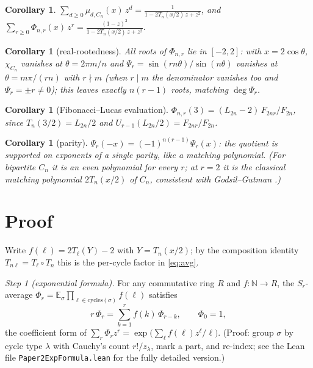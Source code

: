 \documentclass[11pt]{article}
\newtheorem{corollary}[theorem]{Corollary}
\theoremstyle{remark}
\newcommand{\E}{\mathbb{E}}
\begin{document}
\begin{corollary}\label{cor:gf}
$\displaystyle\sum_{d\ge 0}\mu_{d,C_n}(x)\,z^d=\frac{1}{1-2T_n(x/2)\,z+z^2}$,
\quad and \quad
$\displaystyle\sum_{r\ge 0}\Phi_{n,r}(x)\,z^r=\frac{(1-z)^2}{1-2T_n(x/2)\,z+z^2}$.
\end{corollary}

\begin{corollary}[real-rootedness]\label{cor:roots}
All roots of $\Phi_{n,r}$ lie in $[-2,2]$: with $x=2\cos\theta$,
$\chi_{C_n}$ vanishes at $\theta=2\pi m/n$ and
$\Psi_r=\sin(rn\theta)/\sin(n\theta)$ vanishes at $\theta=m\pi/(rn)$ with $r\nmid m$
(when $r\mid m$ the denominator vanishes too and $\Psi_r=\pm r\neq0$); this leaves
exactly $n(r-1)$ roots, matching $\deg\Psi_r$.
\end{corollary}

\begin{corollary}[Fibonacci--Lucas evaluation]\label{cor:fib}
$\Phi_{n,r}(3)=(L_{2n}-2)\,F_{2nr}/F_{2n}$, since $T_n(3/2)=L_{2n}/2$ and
$U_{r-1}(L_{2n}/2)=F_{2nr}/F_{2n}$.
\end{corollary}

\begin{corollary}[parity]\label{cor:parity}
$\Psi_r(-x)=(-1)^{n(r-1)}\Psi_r(x)$: the quotient is supported on exponents
of a single parity, like a matching polynomial. (For bipartite $C_n$ it is an
even polynomial for every $r$; at $r=2$ it is the classical matching
polynomial $2T_n(x/2)$ of $C_n$, consistent with Godsil--Gutman
\cite{GG}.)
\end{corollary}

\section{Proof}

Write $f(\ell)=2T_\ell(Y)-2$ with $Y=T_n(x/2)$; by the composition identity
$T_{n\ell}=T_\ell\circ T_n$ this is the per-cycle factor in \eqref{eq:avg}.

\emph{Step 1 (exponential formula).} For any commutative ring $R$ and
$f:\mathbb N\to R$, the $S_r$-average
$\Phi_r=\E_\sigma\prod_{\ell\in\mathrm{cycles}(\sigma)}f(\ell)$ satisfies
\begin{equation}\label{eq:newton}
r\,\Phi_r=\sum_{k=1}^{r}f(k)\,\Phi_{r-k},\qquad\Phi_0=1 ,
\end{equation}
the coefficient form of $\sum_r\Phi_r z^r=\exp\bigl(\sum_\ell f(\ell)z^\ell/\ell\bigr)$.
(Proof: group $\sigma$ by cycle type $\lambda$ with Cauchy's count
$r!/z_\lambda$, mark a part, and re-index; see the Lean file
\texttt{Paper2ExpFormula.lean} for the fully detailed version.)
\end{document}
